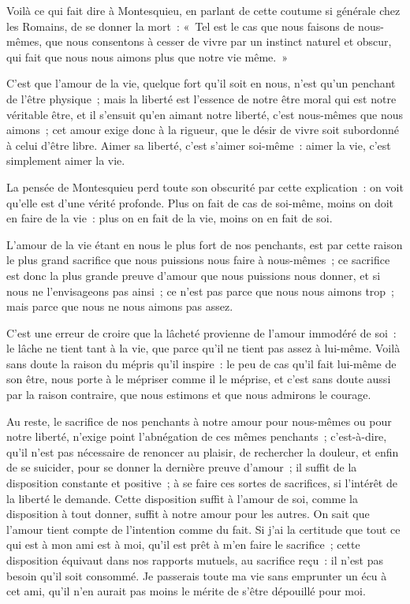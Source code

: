 \documentclass[french,twoside]{book} %
\begin{document}
Voilà ce qui fait dire à Montesquieu, en parlant de cette coutume si générale chez les Romains, de se donner la mort : « Tel est le cas que nous faisons de nous-mêmes, que nous consentons à cesser de vivre par un instinct naturel et obscur, qui fait que nous nous aimons plus que notre vie même. »\par
C’est que l’amour de la vie, quelque fort qu’il soit en nous, n’est qu’un penchant de l’être physique ; mais la liberté est l’essence de notre être moral qui est notre véritable être, et il s’ensuit qu’en aimant notre liberté, c’est nous-mêmes que nous aimons ; cet amour exige donc à la rigueur, que le désir de vivre soit subordonné à celui d’être libre. Aimer sa liberté, c’est s’aimer soi-même : aimer la vie, c’est simplement aimer la vie.\par
La pensée de Montesquieu perd toute son obscurité par cette explication : on voit qu’elle est d’une vérité profonde. Plus on fait de cas de soi-même, moins on doit en faire de la vie : plus on en fait de la vie, moins on en fait de soi.\par
L’amour de la vie étant en nous le plus fort de nos penchants, est par cette raison le plus grand sacrifice que nous puissions nous faire à nous-mêmes ; ce sacrifice est donc la plus grande preuve d’amour que nous puissions nous donner, et si nous ne l’envisageons pas ainsi ; ce n’est pas parce que nous nous aimons trop ; mais parce que nous ne nous aimons pas assez.\par
C’est une erreur de croire que la lâcheté provienne de l’amour immodéré de soi : le lâche ne tient tant à la vie, que parce qu’il ne tient pas assez à lui-même. Voilà sans doute la raison du mépris qu’il inspire : le peu de cas qu’il fait lui-même de son être, nous porte à le mépriser comme il le méprise, et c’est sans doute aussi par la raison contraire, que nous estimons et que nous admirons le courage.\par
Au reste, le sacrifice de nos penchants à notre amour pour nous-mêmes ou pour notre liberté, n’exige point l’abnégation de ces mêmes penchants ; c’est-à-dire, qu’il n’est pas nécessaire de renoncer au plaisir, de rechercher la douleur, et enfin de se suicider, pour se donner la dernière preuve d’amour ; il suffit de la disposition constante et positive ; à se faire ces sortes de sacrifices, si l’intérêt de la liberté le demande. Cette disposition suffit à l’amour de soi, comme la disposition à tout donner, suffit à notre amour pour les autres. On sait que l’amour tient compte de l’intention comme du fait. Si j’ai la certitude que tout ce qui est à mon ami est à moi, qu’il est prêt à m’en faire le sacrifice ; cette disposition équivaut dans nos rapports mutuels, au sacrifice reçu : il n’est pas besoin qu’il soit consommé. Je passerais toute ma vie sans emprunter un écu à cet ami, qu’il n’en aurait pas moins le mérite de s’être dépouillé pour moi.\par
\end{document}
